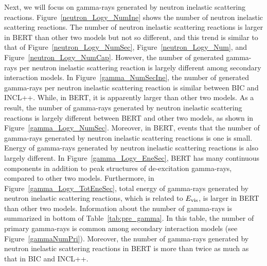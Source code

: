\clearpage

\hs
Next, we will focus on gamma-rays generated by neutron inelastic scattering reactions.
Figure~\ref{neutron_Logy_NumIne} shows the number of neutron inelastic scattering reactions.
The number of neutron inelastic scattering reactions is larger in BERT than other two models but not so different, and this trend is similar to that of Figure~\ref{neutron_Logy_NumSec}, Figure~\ref{neutron_Logy_Num}, and Figure~\ref{neutron_Logy_NumCap}.
However, the number of generated gamma-rays per neutron inelastic scattering reaction is largely different among secondary interaction models.
In Figure~\ref{gamma_NumSecIne}, the number of generated gamma-rays per neutron inelastic scattering reaction is similar between BIC and INCL++.
While, in BERT, it is apparently larger than other two models.
As a result, the number of gamma-rays generated by neutron inelastic scattering reactions is largely different between BERT and other two models, as shown in Figure~\ref{gamma_Logy_NumSec}.
Moreover, in BERT, events that the number of gamma-rays generated by neutron inelastic scattering reactions is one is small.
Energy of gamma-rays generated by neutron inelastic scattering reactions is also largely different.
In Figure~\ref{gamma_Logy_EneSec}, BERT has many continuous components in addition to peak structures of de-excitation gamma-rays, compared to other two models.
Furthermore, in Figure~\ref{gamma_Logy_TotEneSec}, total energy of gamma-rays generated by neutron inelastic scattering reactions, which is related to $E_{\rm vis}$, is larger in BERT than other two models.
Information about the number of gamma-rays is summarized in bottom of Table~\ref{tab:pre_gamma}.
In this table, the number of primary gamma-rays is common among secondary interaction models (see Figure~\ref{gammaNumPri}).
Moreover, the number of gamma-rays generated by neutron inelastic scattering reactions in BERT is more than twice as much as that in BIC and INCL++.

